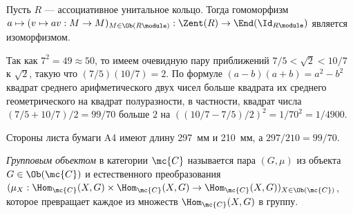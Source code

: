 \documentclass[
	extrafontsizes,
	11pt,
	hyphens,
]{memoir}
\begin{document}

\begin{observation}
Пусть \(R\) --- ассоциативное унитальное кольцо.
Тогда гомоморфизм
\(a \mapsto (v \mapsto av : M \to M)_{M \in \Ob(R\module)} : \Zent(R)
\to \End(\Id_{R\module})\)
является изоморфизмом.
\end{observation}

\begin{observation}
Так как \(7^2 = 49 \approx 50\), то имеем очевидную пару приближений \(7/5 < \sqrt{2} < 10/7\) к \(\sqrt{2}\), такую что \((7/5)(10/7) = 2\).%
\label{obs:SqrtTwoApprox}
По формуле \((a - b)(a + b) = a^2 - b^2\) квадрат среднего арифметического двух чисел больше квадрата их среднего геометрического на квадрат полуразности, в частности, квадрат числа \((7/5 + 10/7)/2 = 99/70\) больше \(2\) на \(((10/7 - 7/5)/2)^2 = 1 / 70^2 = 1 / 4900\).
\end{observation}

\begin{remark}
Стороны листа бумаги A4 имеют длину 297~мм и 210~мм, а \(297 / 210 = 99 / 70\).
\end{remark}

\begin{definition}
\emph{Групповым объектом}%
\label{def:GroupObject}
в категории \(\mc{C}\) называется пара \((G, \mu)\) из объекта \(G \in \Ob(\mc{C})\) и естественного преобразования
\((\mu_X : \Hom_{\mc{C}}(X,G) \times \Hom_{\mc{C}}(X,G) \to \Hom_{\mc{C}}(X,G))_{X \in \Ob(\mc{C})}\),
которое превращает каждое из множеств \(\Hom_{\mc{C}}(X, G)\) в группу.
\end{definition}





















\backmatter



\makeatletter
\renewcommand*{\toclevel@chapter}{-1}
\makeatother


\listoffigures


\printbibliography
\end{document}

